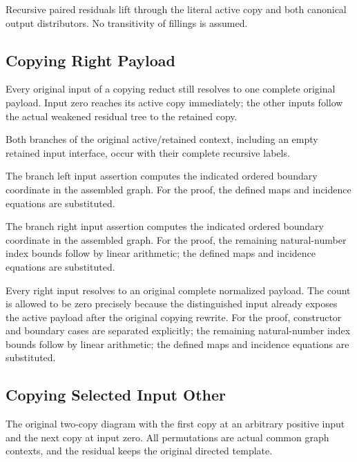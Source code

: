 Recursive paired residuals lift through the literal active copy and both canonical output distributors. No transitivity of fillings is assumed.
\par{}

\subsection{Copying Right Payload}
Every original input of a copying reduct still resolves to one complete original payload. Input zero reaches its active copy immediately; the other inputs follow the actual weakened residual tree to the retained copy.

Both branches of the original active/retained context, including an empty retained input interface, occur with their complete recursive labels.
\par{}

The branch left input assertion computes the indicated ordered boundary coordinate in the assembled graph.
For the proof, the defined maps and incidence equations are substituted.
\par{}

The branch right input assertion computes the indicated ordered boundary coordinate in the assembled graph.
For the proof, the remaining natural-number index bounds follow by linear arithmetic; the defined maps and incidence equations are substituted.
\par{}

Every right input resolves to an original complete normalized payload. The count is allowed to be zero precisely because the distinguished input already exposes the active payload after the original copying rewrite.
For the proof, constructor and boundary cases are separated explicitly; the remaining natural-number index bounds follow by linear arithmetic; the defined maps and incidence equations are substituted.
\par{}

\subsection{Copying Selected Input Other}
The original two-copy diagram with the first copy at an arbitrary positive input and the next copy at input zero. All permutations are actual common graph contexts, and the residual keeps the original directed template.

